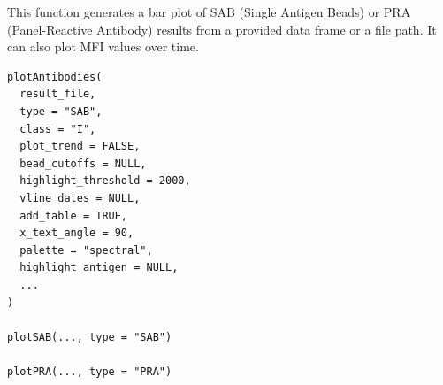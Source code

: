 \documentclass[letterpaper]{book}
\begin{document}
%
\begin{Description}
This function generates a bar plot of SAB (Single Antigen Beads) or PRA (Panel-Reactive Antibody) results
from a provided data frame or a file path. It can also plot MFI values over time.
\end{Description}
%
\begin{Usage}
\begin{verbatim}
plotAntibodies(
  result_file,
  type = "SAB",
  class = "I",
  plot_trend = FALSE,
  bead_cutoffs = NULL,
  highlight_threshold = 2000,
  vline_dates = NULL,
  add_table = TRUE,
  x_text_angle = 90,
  palette = "spectral",
  highlight_antigen = NULL,
  ...
)

plotSAB(..., type = "SAB")

plotPRA(..., type = "PRA")
\end{verbatim}
\end{Usage}
%
\end{document}
